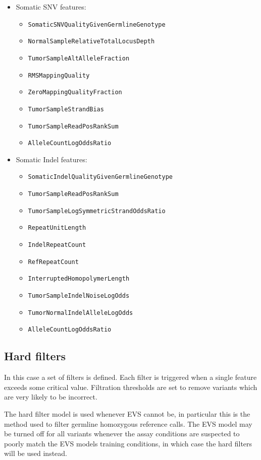 \documentclass{article}
\begin{document}
\begin{itemize}
    \item Somatic SNV features:
    \begin{itemize}
        \item \texttt{SomaticSNVQualityGivenGermlineGenotype}
        \item \texttt{NormalSampleRelativeTotalLocusDepth}
        \item \texttt{TumorSampleAltAlleleFraction}
        \item \texttt{RMSMappingQuality}
        \item \texttt{ZeroMappingQualityFraction}
        \item \texttt{TumorSampleStrandBias}
        \item \texttt{TumorSampleReadPosRankSum}
        \item \texttt{AlleleCountLogOddsRatio}
    \end{itemize}
    \item Somatic Indel features:
    \begin{itemize}
        \item \texttt{SomaticIndelQualityGivenGermlineGenotype}
        \item \texttt{TumorSampleReadPosRankSum}
        \item \texttt{TumorSampleLogSymmetricStrandOddsRatio}
        \item \texttt{RepeatUnitLength}
        \item \texttt{IndelRepeatCount}
        \item \texttt{RefRepeatCount}
        \item \texttt{InterruptedHomopolymerLength}
        \item \texttt{TumorSampleIndelNoiseLogOdds}
        \item \texttt{TumorNormalIndelAlleleLogOdds}
        \item \texttt{AlleleCountLogOddsRatio}
    \end{itemize}
\end{itemize}

\subsection{Hard filters}

In this case a set of filters is defined. Each filter is triggered when a single feature exceeds some critical value. Filtration thresholds are set to remove variants which are very likely to be incorrect.

The hard filter model is used whenever EVS cannot be, in particular this is the method used to filter germline homozygous reference calls. The EVS model may be turned off for all variants whenever the assay conditions are suspected to poorly match the EVS models training conditions, in which case the hard filters will be used instead.
\end{document}
